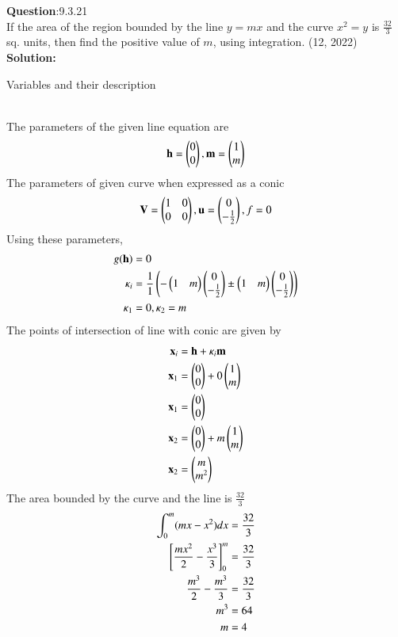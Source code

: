 \documentclass[journal]{IEEEtran}
\begin{document}
\textbf{Question}:9.3.21\\
If the area of the region bounded by the line $y = mx$ and the curve $x^2 = y$ is $\frac{32}{3}$ sq. units, then find the positive value of $m$, using integration. \hfill(12, 2022)
\\
\textbf{Solution:}
\renewcommand{\tablename}{Table 9.3.21.1}
\begin{table}[h!]
  \centering
  
  \caption{Variables and their description}
\end{table}
\\
The parameters of the given line equation are
\begin{align}
\mathbf{h} = \begin{pmatrix}0 \\ 0\end{pmatrix}, \mathbf{m} = \begin{pmatrix}1 \\ m\end{pmatrix}
\end{align}
The parameters of given curve when expressed as a conic
\begin{align}
  \textbf{V} = \begin{pmatrix}1 & 0 \\0 & 0\end{pmatrix},\mathbf{u} = \begin{pmatrix}0 \\ -\frac{1}{2}\end{pmatrix},f = 0 
\end{align}
Using these parameters,
\begin{align}
    g(\mathbf{h}) & = 0 \\
    \kappa_i & = \frac{1}{1}\left(-\begin{pmatrix}1 & m\end{pmatrix}\begin{pmatrix}0 \\ -\frac{1}{2}\end{pmatrix} \pm \begin{pmatrix}1 & m\end{pmatrix}\begin{pmatrix}0 \\ -\frac{1}{2}\end{pmatrix}\right) \\
    \kappa_1 & = 0, \kappa_2 = m
    \end{align}
The points of intersection of  line with conic are given by
\begin{align}
    \mathbf{x}_i & = \mathbf{h} + \kappa_i\mathbf{m} \\
    \mathbf{x}_1 & = \begin{pmatrix}0 \\ 0\end{pmatrix} + 0\begin{pmatrix}1 \\ m\end{pmatrix} \\
    \mathbf{x}_1 & = \begin{pmatrix}0 \\ 0\end{pmatrix} \\
    \mathbf{x}_2 & = \begin{pmatrix}0 \\ 0\end{pmatrix} + m\begin{pmatrix}1 \\ m\end{pmatrix} \\
    \mathbf{x}_2 & = \begin{pmatrix}m \\ m^2\end{pmatrix}
\end{align}
The area bounded by the curve and the line is $\frac{32}{3}$
\begin{align}
   \int_{0}^{m} (mx - x^2)dx & = \frac{32}{3} \\
   {}\left[\frac{mx^2}{2} - \frac{x^3}{3}\right]_{0}^{m} & = \frac{32}{3} \\
   \frac{m^3}{2} - \frac{m^3}{3} & = \frac{32}{3} \\
   m^3 & = 64 \\
   m & = 4
   \end{align}
\end{document}
